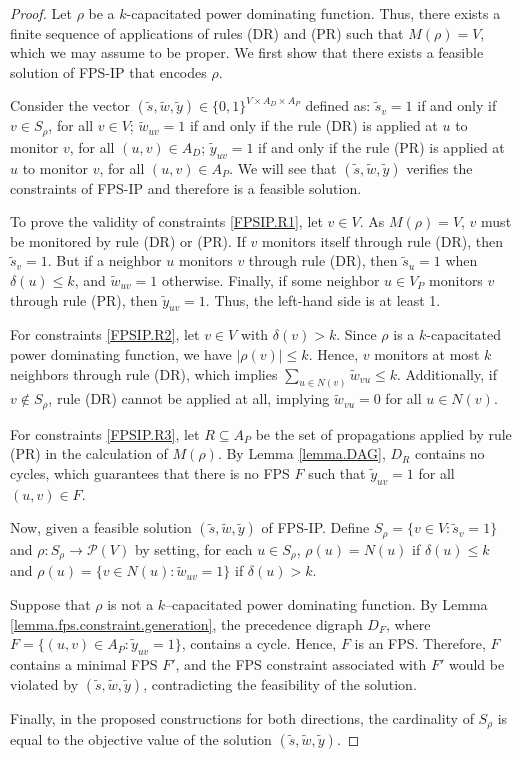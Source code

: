 \documentclass{article}
\newcommand{\PP}{{\mathcal P}}
\newcommand{\FPSIP}{FPS-IP\xspace}
\begin{document}
\begin{proof}
Let $\rho$ be a $k$-capacitated power dominating function. 
Thus, there exists a finite sequence of applications of rules (DR) and (PR) such that $M(\rho) = V$, which we may assume to be proper.
We first show that there exists a feasible solution of \FPSIP that encodes $\rho$.

Consider the vector $(\tilde s, \tilde w, \tilde y) \in \{0,1\}^{V \times A_D \times A_P}$ defined as: $\tilde s_v = 1$ if and only if $v \in S_{\rho}$, for all $v \in V$; $\tilde w_{uv} = 1$ if and only if the rule (DR) is applied at $u$ to monitor $v$, for all $(u,v) \in A_D$; $\tilde y_{uv} = 1$ if and only if the rule (PR) is applied at $u$ to monitor $v$, for all $(u,v) \in A_P$.
We will see that $(\tilde s, \tilde w, \tilde y)$ verifies the constraints of \FPSIP and therefore is a feasible solution.

To prove the validity of constraints \eqref{FPSIP.R1}, let $v \in V$. 
As $M(\rho) = V$, $v$ must be monitored by rule (DR) or (PR).
If $v$ monitors itself through rule (DR), then $\tilde s_v = 1$.
But if a neighbor $u$ monitors $v$ through rule (DR), then $\tilde s_u = 1$ when $\delta(u) \leq k$, and $\tilde w_{uv} = 1$ otherwise.
Finally, if some neighbor $u \in V_P$ monitors $v$ through rule (PR), then $\tilde y_{uv} = 1$.
Thus, the left-hand side is at least 1.

For constraints \eqref{FPSIP.R2}, let $v \in V$ with $\delta(v) > k$. 
Since $\rho$ is a $k$-capacitated power dominating function, we have $|\rho(v)| \leq k$. Hence, $v$ monitors at most $k$ neighbors through rule (DR), which implies $\sum_{u \in N(v)} \tilde w_{vu} \leq k$. 
Additionally, if $v \notin S_{\rho}$, rule (DR) cannot be applied at all, implying $\tilde w_{vu} = 0$ for all $u \in N(v)$. 

For constraints \eqref{FPSIP.R3}, let $R \subseteq A_P$ be the set of propagations applied by rule (PR) in the calculation of $M(\rho)$. By Lemma \ref{lemma.DAG}, $D_R$ contains no  cycles, which guarantees that there is no FPS $F$ such that $\tilde y_{uv} = 1$ for all $(u,v) \in F$.

\medskip

Now, given a feasible solution $(\tilde s, \tilde w, \tilde y)$ of \FPSIP.
Define $S_{\rho} = \{v \in V: \tilde s_v = 1\}$ and $\rho: S_{\rho} \to \PP(V)$ by setting, for each $u \in S_{\rho}$, $\rho(u) = N(u)$ if $\delta(u) \leq k$ and $\rho(u) = \{v \in N(u): \tilde w_{uv} = 1\}$ if $\delta(u) > k$.

Suppose that $\rho$ is not a $k$--capacitated power dominating function.
By Lemma \ref{lemma.fps.constraint.generation}, the precedence digraph $D_F$, where $F = \{(u,v) \in A_P: \tilde y_{uv} = 1\}$, contains a  cycle.
Hence, $F$ is an FPS.
Therefore, $F$ contains a minimal FPS $F'$, and the FPS constraint associated with $F'$ would be violated by $(\tilde s, \tilde w, \tilde y)$, contradicting the feasibility of the solution.

\medskip

Finally, in the proposed constructions for both directions, the cardinality of $S_{\rho}$ is equal to the objective value of the solution $(\tilde s, \tilde w, \tilde y)$.
\end{proof}
\end{document}
